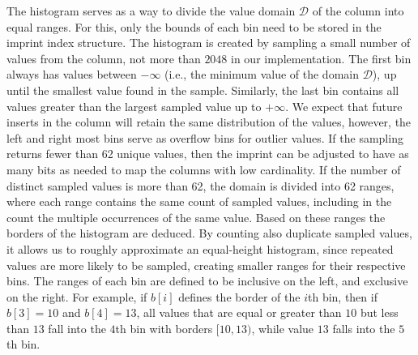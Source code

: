 The histogram serves as a way to divide the value domain $\mathcal{D}$ of the
column into equal ranges. For this, only the bounds of each bin need to be
stored in the imprint index structure. The histogram is created by sampling
a small number of values from the column, not more than $2048$ in our
implementation. The first bin always has values between $-\infty$ (i.e., the
minimum value of the domain $\mathcal{D}$), up until the smallest value
found in the sample. Similarly, the last bin contains all values greater
than the largest sampled value up to $+\infty$. We expect that future
inserts in the column will retain the same distribution of the values, however,
the left and right most bins serve as overflow bins for outlier values. If the
sampling returns fewer than 62 unique values, then the imprint can be
adjusted to have as many bits as needed to map the columns with low
cardinality. If the number of distinct sampled values is more than 62,
the domain is divided into 62 ranges, where each range contains the same
count of sampled values, including in the count the multiple occurrences of the
same value. Based on these ranges the borders of the histogram are deduced.
By counting also duplicate sampled values, it allows us to roughly approximate
an equal-height histogram, since repeated values are more likely to be sampled,
creating smaller ranges for their respective bins. The ranges of each bin are
defined to be inclusive on the left, and exclusive on the right. For example,
if $b[i]$ defines the border of the $i$th bin, then if $b[3]=10$ and
$b[4]=13$, all values that are equal or greater than $10$ but less than
$13$ fall into the $4$th bin with borders $[10,13)$, while value $13$ falls
into the $5$th bin.

